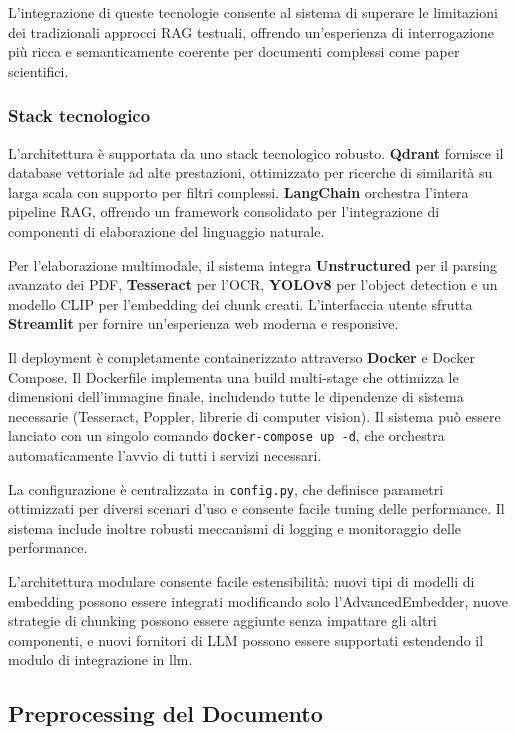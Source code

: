 \documentclass[12pt,a4paper]{article}
\begin{document}
L'integrazione di queste tecnologie consente al sistema di superare le limitazioni dei tradizionali approcci RAG testuali, offrendo un'esperienza di interrogazione più ricca e semanticamente coerente per documenti complessi come paper scientifici.

\subsubsection{Stack tecnologico}
L'architettura è supportata da uno stack tecnologico robusto. \textbf{Qdrant} fornisce il database vettoriale ad alte prestazioni, ottimizzato per ricerche di similarità su larga scala con supporto per filtri complessi. \textbf{LangChain} orchestra l'intera pipeline RAG, offrendo un framework consolidato per l'integrazione di componenti di elaborazione del linguaggio naturale.

Per l'elaborazione multimodale, il sistema integra \textbf{Unstructured} per il parsing avanzato dei PDF, \textbf{Tesseract} per l'OCR, \textbf{YOLOv8} per l'object detection e un modello CLIP per l'embedding dei chunk creati. L'interfaccia utente sfrutta \textbf{Streamlit} per fornire un'esperienza web moderna e responsive.

Il deployment è completamente containerizzato attraverso \textbf{Docker} e Docker Compose. Il Dockerfile implementa una build multi-stage che ottimizza le dimensioni dell'immagine finale, includendo tutte le dipendenze di sistema necessarie (Tesseract, Poppler, librerie di computer vision). Il sistema può essere lanciato con un singolo comando \verb|docker-compose up -d|, che orchestra automaticamente l'avvio di tutti i servizi necessari.

La configurazione è centralizzata in \texttt{config.py}, che definisce parametri ottimizzati per diversi scenari d'uso e consente facile tuning delle performance. Il sistema include inoltre robusti meccanismi di logging e monitoraggio delle performance.

L'architettura modulare consente facile estensibilità: nuovi tipi di modelli di embedding possono essere integrati modificando solo l'AdvancedEmbedder, nuove strategie di chunking possono essere aggiunte senza impattare gli altri componenti, e nuovi fornitori di LLM possono essere supportati estendendo il modulo di integrazione in llm.

\subsection{Preprocessing del Documento}
\end{document}
